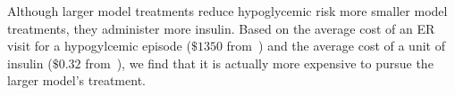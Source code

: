 Although larger model treatments reduce hypoglycemic risk more smaller model treatments, they administer more insulin. Based on the average cost of an ER visit for a hypogylcemic episode ($\$1350$ from~\citet{bronstone2016hypoglycemic_cost}) and the average cost of a unit of insulin ($\$0.32$ from~\citet{lee2020insulin}), we find that it is actually more expensive to pursue the larger model's treatment. %









